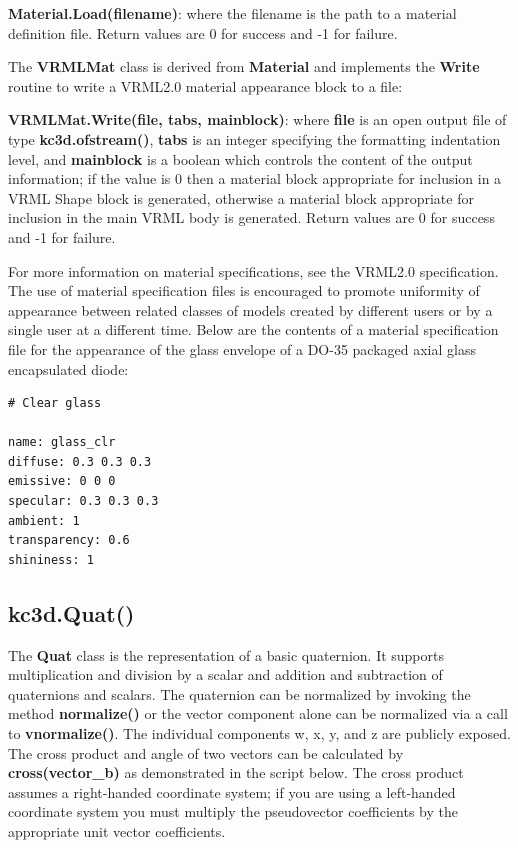\textbf{Material.Load(filename)}: where the filename is the path to a
material definition file. Return values are 0 for success and -1 for failure.

The \textbf{VRMLMat} class is derived from \textbf{Material} and implements
the \textbf{Write} routine to write a VRML2.0 material appearance block to
a file:

\textbf{VRMLMat.Write(file, tabs, mainblock)}: where \textbf{file} is an open
output file of type \textbf{kc3d.ofstream()}, \textbf{tabs} is an integer
specifying the formatting indentation level, and \textbf{mainblock} is a boolean
which controls the content of the output information; if the value is 0 then
a material block appropriate for inclusion in a VRML Shape block is generated,
otherwise a material block appropriate for inclusion in the main VRML body
is generated.  Return values are 0 for success and -1 for failure.

For more information on material specifications, see the VRML2.0 specification.
The use of material specification files is encouraged to promote uniformity of
appearance between related classes of models created by different users or by
a single user at a different time. Below are the contents of a material
specification file for the appearance of the glass envelope of a DO-35 packaged
axial glass encapsulated diode:

\begin{verbatim}
# Clear glass

name: glass_clr
diffuse: 0.3 0.3 0.3
emissive: 0 0 0
specular: 0.3 0.3 0.3
ambient: 1
transparency: 0.6
shininess: 1
\end{verbatim}

\subsection{kc3d.Quat()}
The \textbf{Quat} class is the representation of a basic quaternion. It supports
multiplication and division by a scalar and addition and subtraction of quaternions
and scalars. The quaternion can be normalized by invoking the method \textbf{normalize()}
or the vector component alone can be normalized via a call to \textbf{vnormalize()}.
The individual components w, x, y, and z are publicly exposed. The cross product
and angle of two vectors can be calculated by \textbf{cross(vector\_b)} as demonstrated
in the script below. The cross product assumes a right-handed coordinate system; if
you are using a left-handed coordinate system you must multiply the pseudovector
coefficients by the appropriate unit vector coefficients.

